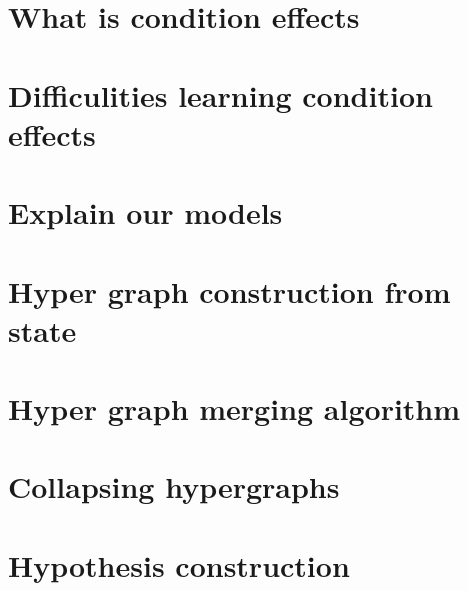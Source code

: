 \documentclass[Master.tex]{subfiles}
\begin{document}
\section{What is condition effects}
    

\section{Difficulities learning condition effects}
    

\section{Explain our models}
    

\section{Hyper graph construction from state}
	

\section{Hyper graph merging algorithm}
	

\section{Collapsing hypergraphs}
	

\section{Hypothesis construction}
\end{document}
